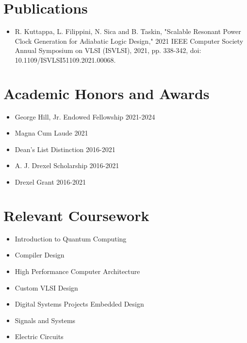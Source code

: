 \documentclass[letterpaper,11pt]{article}
\newcommand{\resumeItem}[1]{
  \item\small{
    {#1 \vspace{-2pt}}
  }
}
\newcommand{\resumeSubHeadingListStart}{\begin{itemize}[leftmargin=0.0in, label={}]}
\newcommand{\resumeSubHeadingListEnd}{\end{itemize}}
\newcommand{\resumeItemListStart}{\begin{itemize}}
\newcommand{\resumeItemListEnd}{\end{itemize}\vspace{-5pt}}
\begin{document}
\section{Publications}
\resumeItemListStart
	\resumeItem{R. Kuttappa, L. Filippini, N. Sica and B. Taskin,
		"Scalable Resonant Power Clock Generation for Adiabatic Logic Design,"
		2021 IEEE Computer Society Annual Symposium on VLSI (ISVLSI), 2021,
		pp. 338-342, doi: 10.1109/ISVLSI51109.2021.00068.}
\resumeItemListEnd
\sectionsep


\section{Academic Honors and Awards}
\resumeItemListStart
  \resumeItem{George Hill, Jr. Endowed Fellowship 2021-2024}
  \resumeItem{Magna Cum Laude 2021}
  \resumeItem{Dean's List Distinction 2016-2021}
  \resumeItem{A. J. Drexel Scholarship 2016-2021}
  \resumeItem{Drexel Grant 2016-2021}
\resumeItemListEnd


\section{Relevant Coursework}
        \begin{multicols}{4}
            \begin{itemize}[itemsep=-5pt, parsep=3pt]
                \item\small Introduction to Quantum Computing
                \item Compiler Design
                \item High Performance Computer Architecture
                \item Custom VLSI Design
                \item Digital Systems Projects Embedded Design
                \item Signals and Systems
                \item Electric Circuits
            \end{itemize}
        \end{multicols}
\end{document}
